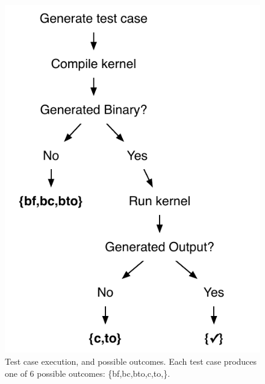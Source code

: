\begin{figure}
  \centering %
  \includegraphics[width=.6\columnwidth]{img/test_process}%
  \caption{%
  	Test case execution, and possible outcomes. Each test case produces one of 6 possible outcomes: \{bf,bc,bto,c,to,\cmark\}.%
  }%
  \label{fig:test-process} %
\end{figure}

